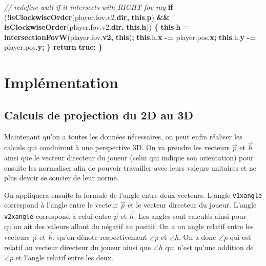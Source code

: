 \documentclass[11pt,french,a4paper,]{article}
\newenvironment{Shaded}{\begin{snugshade}}{\end{snugshade}}
\newcommand{\AttributeTok}[1]{\textcolor[rgb]{0.00,0.36,0.77}{\textbf{#1}}}
\newcommand{\CommentTok}[1]{\textcolor[rgb]{0.35,0.35,0.35}{\textit{#1}}}
\newcommand{\ControlFlowTok}[1]{\textcolor[rgb]{0.68,0.35,0.62}{\textbf{#1}}}
\newcommand{\KeywordTok}[1]{\textcolor[rgb]{0.68,0.35,0.62}{\textbf{#1}}}
\newcommand{\NormalTok}[1]{#1}
\newcommand{\OperatorTok}[1]{\textcolor[rgb]{0.81,0.36,0.00}{\textbf{#1}}}
\newcommand{\VariableTok}[1]{\textcolor[rgb]{0.90,0.33,0.00}{#1}}
\begin{document}
\begin{Shaded}
\begin{Highlighting}[]
    \CommentTok{//  redefine wall if it intersects with RIGHT fov ray}
    \ControlFlowTok{if}\NormalTok{ (}\OperatorTok{!}\AttributeTok{isClockwiseOrder}\NormalTok{(}\VariableTok{player}\NormalTok{.}\VariableTok{fov}\NormalTok{.}\VariableTok{v2}\NormalTok{.}\AttributeTok{dir}\OperatorTok{,} \KeywordTok{this}\NormalTok{.}\AttributeTok{p}\NormalTok{) }\OperatorTok{&&}
            \AttributeTok{isClockwiseOrder}\NormalTok{(}\VariableTok{player}\NormalTok{.}\VariableTok{fov}\NormalTok{.}\VariableTok{v2}\NormalTok{.}\AttributeTok{dir}\OperatorTok{,} \KeywordTok{this}\NormalTok{.}\AttributeTok{h}\NormalTok{)) }\OperatorTok{\{}
        \KeywordTok{this}\NormalTok{.}\AttributeTok{h} \OperatorTok{=} \AttributeTok{intersectionFovW}\NormalTok{(}\VariableTok{player}\NormalTok{.}\VariableTok{fov}\NormalTok{.}\AttributeTok{v2}\OperatorTok{,} \KeywordTok{this}\NormalTok{)}\OperatorTok{;}
        \KeywordTok{this}\NormalTok{.}\VariableTok{h}\NormalTok{.}\AttributeTok{x} \OperatorTok{-=} \VariableTok{player}\NormalTok{.}\VariableTok{pos}\NormalTok{.}\AttributeTok{x}\OperatorTok{;}
        \KeywordTok{this}\NormalTok{.}\VariableTok{h}\NormalTok{.}\AttributeTok{y} \OperatorTok{-=} \VariableTok{player}\NormalTok{.}\VariableTok{pos}\NormalTok{.}\AttributeTok{y}\OperatorTok{;}
    \OperatorTok{\}}
    \ControlFlowTok{return} \KeywordTok{true}\OperatorTok{;}
\OperatorTok{\}}
\end{Highlighting}
\end{Shaded}

\hypertarget{impluxe9mentation}{%
\section{Implémentation}\label{impluxe9mentation}}

\hypertarget{calculs-de-projection-du-2d-au-3d}{%
\subsection{Calculs de projection du 2D au
3D}\label{calculs-de-projection-du-2d-au-3d}}

Maintenant qu'on a toutes les données nécessaires, on peut enfin
réaliser les calculs qui conduiront à une perspective 3D. On va prendre
les vecteurs \(\vec{p}\) et \(\vec{h}\) ainsi que le vecteur directeur
du joueur (celui qui indique son orientation) pour ensuite les
normaliser afin de pouvoir travailler avec leurs valeurs unitaires et ne
plus devoir se soucier de leur norme.

On appliquera ensuite la formule de l'angle entre deux vecteurs. L'angle
\texttt{v1xangle} correspond à l'angle entre le vecteur \(\vec{p}\) et
le vecteur directeur du joueur. L'angle \texttt{v2xangle} correspond à
celui entre \(\vec{p}\) et \(\vec{h}\). Les angles sont calculés ainsi
pour qu'on ait des valeurs allant du négatif au positif. On a un angle
relatif entre les vecteurs \(\vec{p}\) et \(\vec{h}\), qu'on dénote
respectivement \(\angle{p}\) et \(\angle{h}\). On a donc \(\angle{p}\)
qui est relatif au vecteur directeur du joueur ainsi que \(\angle{h}\)
qui n'est qu'une addition de \(\angle{p}\) et l'angle relatif entre les
deux.
\end{document}

